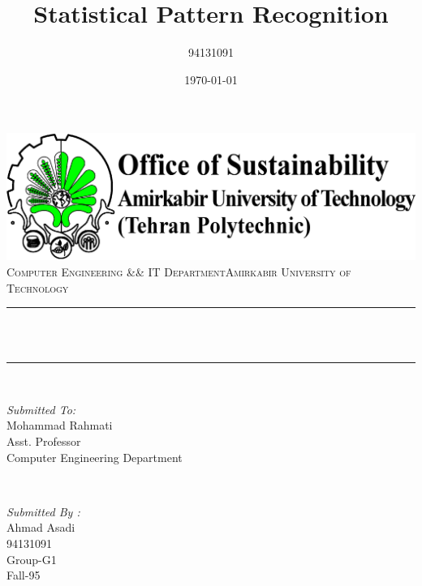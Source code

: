 \documentclass[12pt]{article}
\title{Statistical Pattern Recognition}								%
\author{94131091}								%
\date{\today}											%
\makeatletter
\let\thetitle\@title
\makeatother
\begin{document}

\begin{titlepage}
	\centering
    \vspace*{0.5 cm}
    \includegraphics[scale = 1]{Imgs/logo.png}\\[1.0 cm]	%
    \textsc{\Large Computer Engineering \&\& IT Department\newline\newline Amirkabir University of Technology}\\[2.0 cm]	%
	\rule{\linewidth}{0.2 mm} \\[0.4 cm]
	{ \huge \bfseries \thetitle}\\
	\rule{\linewidth}{0.2 mm} \\[1.5 cm]
	
	\begin{minipage}{0.4\textwidth}
		\begin{flushleft} \large
			\emph{Submitted To:}\\
			Mohammad Rahmati\\
            Asst. Professor\\
            Computer Engineering Department\\
			\end{flushleft}
			\end{minipage}~
			\begin{minipage}{0.4\textwidth}
            
			\begin{flushright} \large
			\emph{Submitted By :} \\
			Ahmad Asadi\\
            94131091\\
            Group-G1\\
            Fall-95\\
		\end{flushright}
        
	\end{minipage}\\[2 cm]
	
	
    
    
    
    
	
\end{titlepage}
\end{document}
